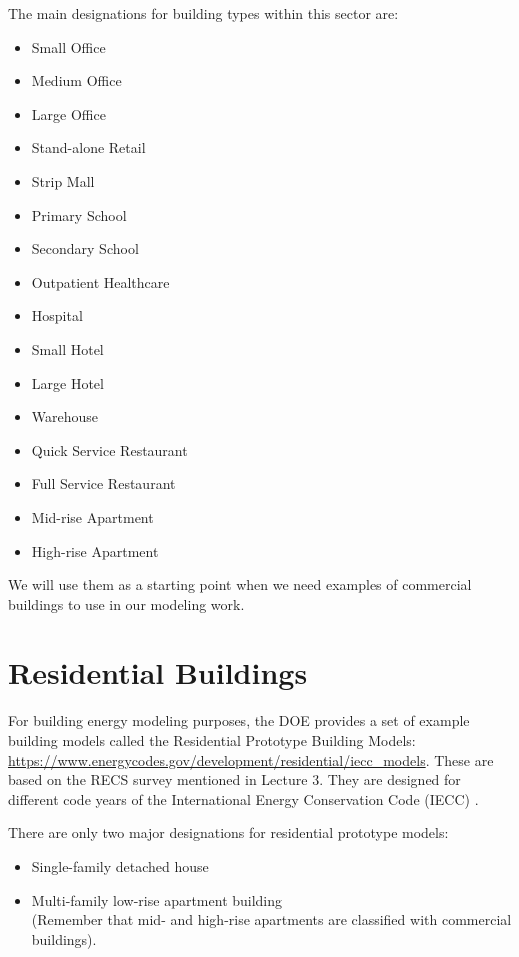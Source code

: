 \documentclass[10pt]{article}
\begin{document}
The main designations for building types within this sector are:
\begin{itemize}
    \setlength{\itemsep}{0pt}%
    \setlength{\parskip}{0pt}%
    \item Small Office
    \item Medium Office
    \item Large Office
    \item Stand-alone Retail
    \item Strip Mall
    \item Primary School
    \item Secondary School
    \item Outpatient Healthcare
    \item Hospital
    \item Small Hotel
    \item Large Hotel
    \item Warehouse
    \item Quick Service Restaurant
    \item Full Service Restaurant
    \item Mid-rise Apartment
    \item High-rise Apartment
\end{itemize}

We will use them as a starting point when we need examples of commercial buildings to use in our modeling work.

\section{Residential Buildings}

For building energy modeling purposes, the DOE provides a set of example building models called the Residential Prototype Building Models:  \url{https://www.energycodes.gov/development/residential/iecc_models}. These are based on the RECS survey mentioned in Lecture 3. They are designed for different code years of the International Energy Conservation Code (IECC) {\color{blue}\cite{IECCresources}}.

There are only two major designations for residential prototype models:
\begin{itemize}
    \setlength{\itemsep}{0pt}%
    \setlength{\parskip}{0pt}%
    \item Single-family detached house
    \item Multi-family low-rise apartment building\\(Remember that mid- and high-rise apartments are classified with commercial buildings).
\end{itemize}
\end{document}
